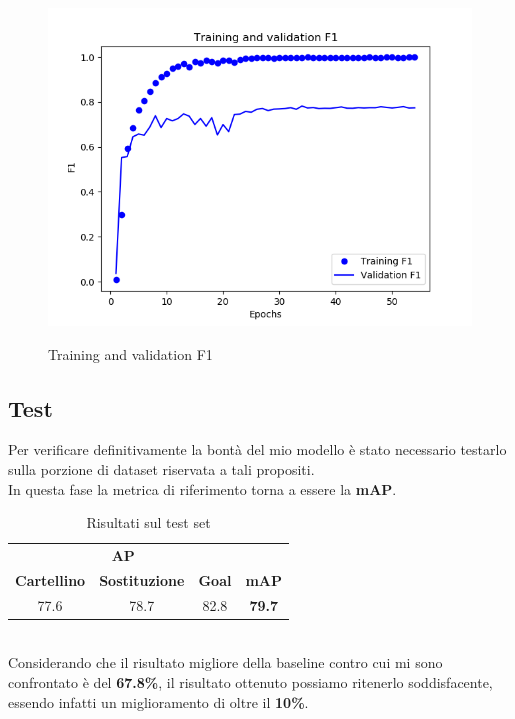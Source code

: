 \begin{figure}[H]
\centering
\caption{Training and validation F1}
\includegraphics[width=\linewidth]{img/training-validation-F1.png}
\label{figure : trainingvalf1}
\end{figure}
\subsection{Test}
Per verificare definitivamente la bontà del mio modello è stato necessario testarlo sulla porzione di dataset riservata a tali propositi. 
\\In questa fase la metrica di riferimento torna a essere la \textbf{mAP}.
\begin{table}[ht]
\label{table: test}
\caption{Risultati sul test set}
\centering
\begin{tabular}{c|c|c||c}
\multicolumn{3}{c}{\textbf{AP}}\\
\textbf{Cartellino} & \textbf{Sostituzione} & \textbf{Goal} & \textbf{mAP} \\
\hline
77.6& 78.7 & 82.8 & \textbf{79.7} \\ [1ex]
\end{tabular}
\end{table}
\\Considerando che il risultato migliore della baseline contro cui mi sono confrontato è del \textbf{67.8\%}, il 
risultato ottenuto possiamo ritenerlo soddisfacente, essendo infatti un miglioramento di oltre il \textbf{10\%}.